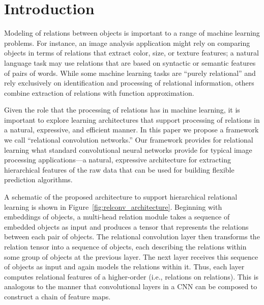 \section{Introduction}\label{sec:intro}



Modeling of relations between objects is important to a range of machine learning problems. For instance, an image analysis application might rely on comparing objects in terms of relations that extract color, 
size, or texture features; a natural language task may use relations that are based on syntactic or semantic features of pairs of words. While some machine learning tasks are ``purely relational'' and rely exclusively on identification and processing of relational information, others combine extraction of relations with function approximation. 

Given the role that the processing of relations has in machine learning, it is important to explore learning architectures that support processing of relations in a natural, expressive, and efficient manner. In this paper we propose a framework we call ``relational convolution networks.'' Our framework provides for relational learning what standard convolutional neural networks provide for typical image processing applications---a natural, expressive architecture for extracting hierarchical features of the raw data that can be used for building flexible prediction algorithms. 

A schematic of the proposed architecture to support hierarchical relational learning is shown in Figure~\ref{fig:relconv_architecture}. Beginning with embeddings of objects, a multi-head relation module takes a sequence of embedded objects as input and produces a tensor that represents the relations between each pair of objects. The relational convolution layer then transforms the relation tensor into a sequence of objects, each describing the relations within some group of objects at the previous layer. The next layer receives this sequence of objects as input and again models the relations within it. Thus, each layer computes relational features of a higher-order (i.e., relations on relations). This is analogous to the manner that convolutional layers in a CNN can be composed to construct a chain of feature maps. 


